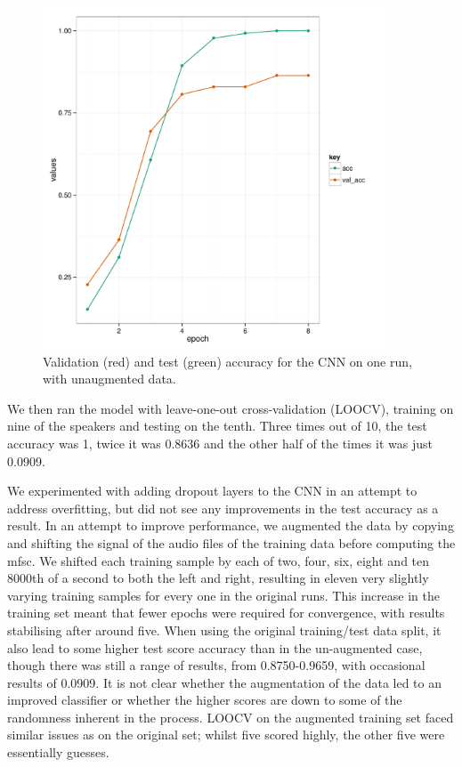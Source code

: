 \begin{figure}[h]
\begin{center}
\includegraphics[height = 4in, width = 4in]{cnn_2d_plot_acc.pdf}
\end{center}
\caption{Validation (red) and test (green) accuracy for the CNN on one run, with unaugmented data.}
\label{fig:2d_acc}
\end{figure}

We then ran the model with leave-one-out cross-validation (LOOCV), training on nine of the speakers and testing on the tenth. Three times out of 10, the test accuracy was 1, twice it was 0.8636 and the other half of the times it was just 0.0909.

We experimented with adding dropout layers to the CNN in an attempt to address overfitting, but did not see any improvements in the test accuracy as a result. In an attempt to improve performance, we augmented the data by copying and shifting the signal of the audio files of the training data before computing the mfsc. We shifted each training sample by each of two, four, six, eight and ten 8000th of a second to both the left and right, resulting in eleven very slightly varying training samples for every one in the original runs. This increase in the training set meant that fewer epochs were required for convergence, with results stabilising after around five. When using the original training/test data split, it also lead to some higher test score accuracy than in the un-augmented case, though there was still a range of results, from 0.8750-0.9659, with occasional results of 0.0909. It is not clear whether the augmentation of the data led to an improved classifier or whether the higher scores are down to some of the randomness inherent in the process.
LOOCV on the augmented training set faced similar issues as on the original set; whilst five scored highly, the other five were essentially guesses.

